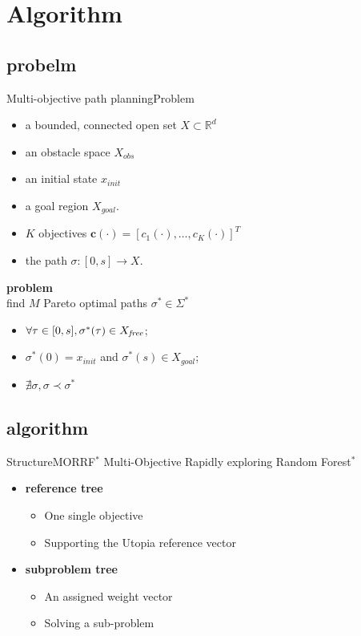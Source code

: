\section{Algorithm}

\subsection{probelm}

\begin{frame}{Multi-objective path planning}{Problem}
	
\begin{itemize}
\item a bounded, connected open set $ X \subset \mathbb{R}^{d} $
\item an obstacle space $ X_{obs} $
\item an initial state $ x_{init} $
\item a goal region $ X_{goal} $. 
\item $K$ objectives  $ \bm{c}(\cdot) = [ c_{1} (\cdot), \ldots , c_{K}(\cdot) ]^{T}$ 
\item the path  $\sigma : [0,s] \rightarrow X$. 
\end{itemize}

\textbf{problem} \\
find $ M $ Pareto optimal paths $ \sigma^{*} \in \Sigma^{*}$ 
\begin{itemize}
\item $\forall \tau\in[0,s], \sigma^*(\tau) \in X_{\it free}$;
\item $ \sigma^{*} (0) = x_{init} $ and $ \sigma^{*} (s) \in X_{goal}  $;
\item $ \nexists \sigma, \sigma \prec \sigma^{*} $     
\end{itemize}                        
	
\end{frame}

\subsection{algorithm}

\begin{frame}{Structure}{MORRF$^{*}$}
Multi-Objective Rapidly exploring Random Forest$^{*}$
\begin{itemize}
	\item \textbf{reference tree}
	\begin{itemize}
	\item One single objective
	\item Supporting the Utopia reference vector
	\end{itemize}	
	\item \textbf{subproblem tree}
	\begin{itemize}
	\item An assigned weight vector 
	\item Solving a sub-problem
	\end{itemize}
\end{itemize}
\end{frame}

